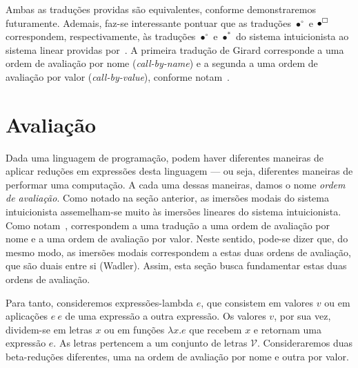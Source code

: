     Ambas as traduções providas são equivalentes, conforme demonstraremos futuramente.
    Ademais, faz-se interessante pontuar que as traduções $\bullet^\circ$ e $\bullet^\Box$ correspondem, respectivamente, às traduções $\bullet^\circ$ e $\bullet^*$ do sistema intuicionista ao sistema linear providas por~\cite{Girard}. A primeira tradução de Girard corresponde a uma ordem de avaliação por nome (\textit{call-by-name}) e a segunda a uma ordem de avaliação por valor (\textit{call-by-value}), conforme notam~\cite{Maraist}.

\section{Avaliação}
    Dada uma linguagem de programação, podem haver diferentes maneiras de aplicar reduções em expressões desta linguagem --- ou seja, diferentes maneiras de performar uma computação.
    A cada uma dessas maneiras, damos o nome \emph{ordem de avaliação}.
    Como notado na seção anterior, as imersões modais do sistema intuicionista assemelham-se muito às imersões lineares do sistema intuicionista.
    Como notam~\cite{Maraist}, correspondem a uma tradução a uma ordem de avaliação por nome e a uma ordem de avaliação por valor.
    Neste sentido, pode-se dizer que, do mesmo modo, as imersões modais correspondem a estas duas ordens de avaliação, que são duais entre si (Wadler).
    Assim, esta seção busca fundamentar estas duas ordens de avaliação.

    Para tanto, consideremos expressões-lambda $e$, que consistem em valores $v$ ou em aplicações $e\ e$ de uma expressão a outra expressão.
    Os valores $v$, por sua vez, dividem-se em letras $x$ ou em funções $\lambda x.e$ que recebem $x$ e retornam uma expressão $e$.
    As letras pertencem a um conjunto de letras $\mathcal{V}$.
    Consideraremos duas beta-reduções diferentes, uma na ordem de avaliação por nome e outra por valor.
